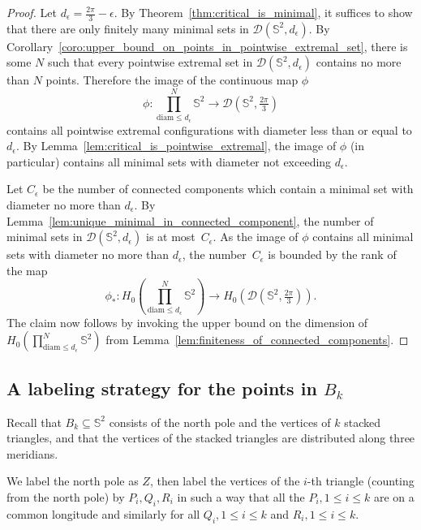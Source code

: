 \documentclass[12pt]{amsart}
\theoremstyle{plain}
\newcommand{\Sp}{\mathbb{S}}
\newcommand{\diam}{\mathrm{diam}}
\newcommand{\np}{Z}
\numberwithin{equation}{section}
\begin{document}
\begin{proof}
Let $d_\epsilon = \frac{2\pi}{3}-\epsilon$.  By
Theorem~\ref{thm:critical_is_minimal}, it suffices to show that there
are only finitely many minimal sets in $\mathcal D(\Sp^2,
d_\epsilon)$.  By
Corollary~\ref{coro:upper_bound_on_points_in_pointwise_extremal_set},
there is some $N$ such that every pointwise extremal set in $\mathcal
D(\Sp^2, d_\epsilon)$ contains no more than $N$ points.  Therefore the
image of the continuous map $\phi$
\[
\phi: \prod\limits_{\diam \leq d_\epsilon}^N\Sp^2 \longrightarrow
\mathcal D(\Sp^2, \tfrac{2\pi}{3})
\]
contains all pointwise extremal configurations with diameter less than
or equal to $d_\epsilon$.  By
Lemma~\ref{lem:critical_is_pointwise_extremal}, the image of $\phi$
(in particular) contains all minimal sets with diameter not exceeding
$d_\epsilon$.

Let $C_\epsilon$ be the number of connected components which contain a
minimal set with diameter no more than $d_\epsilon$.  By
Lemma~\ref{lem:unique_minimal_in_connected_component}, the number of
minimal sets in $\mathcal D(\Sp^2, d_\epsilon)$ is at
most~$C_\epsilon$.  As the image of $\phi$ contains all minimal sets
with diameter no more than $d_\epsilon$, the number~$C_\epsilon$ is
bounded by the rank of the map
\[
\phi_\ast: H_0\left(\prod\limits_{\diam \leq d_\epsilon}^N\Sp^2\right)
\longrightarrow H_0\left(\mathcal D(\Sp^2, \tfrac{2\pi}{3})\right).
\]
The claim now follows by invoking the upper bound on the dimension of
$H_0\left(\prod\limits_{\diam \leq d_\epsilon}^N\Sp^2\right)$ from
Lemma~\ref{lem:finiteness_of_connected_components}.
\end{proof}









\subsection{A labeling strategy for the points in $B_k$}

Recall that $B_k\subseteq \Sp^2$ consists of the north pole and the
vertices of $k$ stacked triangles, and that the vertices of the
stacked triangles are distributed along three meridians.

We label the north pole as $\np$, then label the
  vertices of the $i$-th triangle (counting from the north pole) by
  $P_i, Q_i, R_i$ in such a way that all the $P_i, 1\leq i\leq k$ are
  on a common longitude and similarly for all $Q_i, 1\leq i\leq k$ and
  $R_i, 1\leq i\leq k$.
\end{document}

